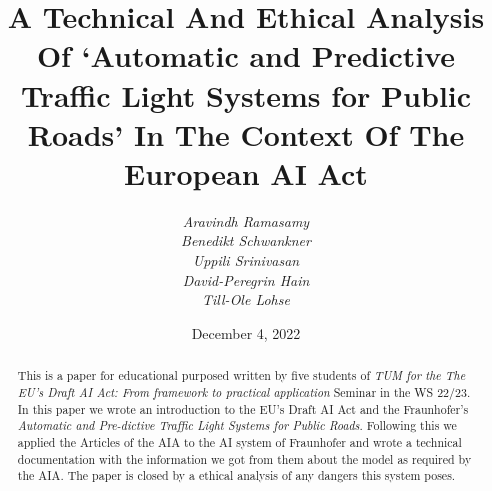 \documentclass{article}
\title{A Technical And Ethical Analysis Of `Automatic and Predictive Traffic Light Systems for Public Roads' In The Context Of The European AI Act}
\date{December 4, 2022}
\author{
        \textit{Aravindh Ramasamy}\\
        \textit{Benedikt Schwankner}\\
        \textit{Uppili Srinivasan}\\
        \textit{David-Peregrin Hain}\\
        \textit{Till-Ole Lohse}
}
\begin{document}
  \maketitle

  \begin{abstract}
    This is a paper for educational purposed written by five students of \emph{TUM for the The EU’s Draft AI Act: From framework to practical application} Seminar in the WS 22/23. In this paper we wrote an introduction to the EU's Draft AI Act and the Fraunhofer’s \emph{Automatic and Pre-dictive Traffic Light Systems for Public Roads}. Following this we applied the Articles of the AIA to the AI system of Fraunhofer and wrote a technical documentation with the information we got from them about the model as required by the AIA. The paper is closed by a ethical analysis of any dangers this system poses.
  \end{abstract}
  \newpage
  
  \tableofcontents

  
  
  
  

\end{document}
